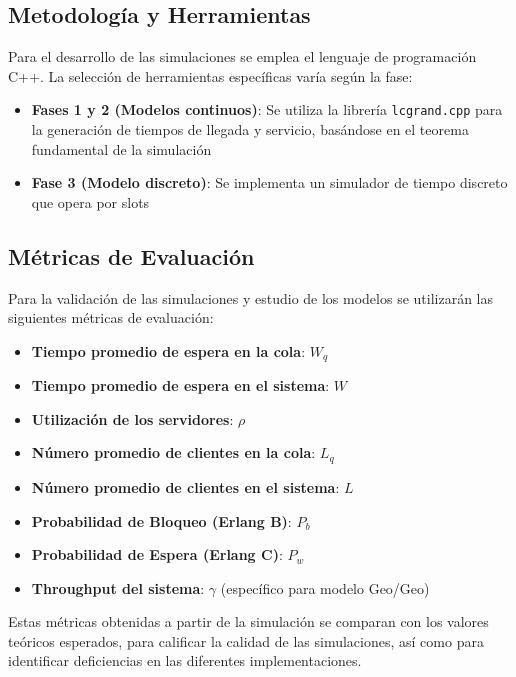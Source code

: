 \documentclass{article}
\begin{document}
\subsection{Metodología y Herramientas}

Para el desarrollo de las simulaciones se emplea el lenguaje de programación C++. La selección de herramientas específicas varía según la fase:

\begin{itemize}
    \item \textbf{Fases 1 y 2 (Modelos continuos)}: Se utiliza la librería \texttt{lcgrand.cpp} para la generación de tiempos de llegada y servicio, basándose en el teorema fundamental de la simulación
    \item \textbf{Fase 3 (Modelo discreto)}: Se implementa un simulador de tiempo discreto que opera por slots
\end{itemize}

\subsection{Métricas de Evaluación}

Para la validación de las simulaciones y estudio de los modelos se utilizarán las siguientes métricas de evaluación:

\begin{itemize}
    \item \textbf{Tiempo promedio de espera en la cola}: $W_q$
    \item \textbf{Tiempo promedio de espera en el sistema}: $W$
    \item \textbf{Utilización de los servidores}: $\rho$
    \item \textbf{Número promedio de clientes en la cola}: $L_q$
    \item \textbf{Número promedio de clientes en el sistema}: $L$
    \item \textbf{Probabilidad de Bloqueo (Erlang B)}: $P_b$
    \item \textbf{Probabilidad de Espera (Erlang C)}: $P_w$
    \item \textbf{Throughput del sistema}: $\gamma$ (específico para modelo Geo/Geo)
\end{itemize}

Estas métricas obtenidas a partir de la simulación se comparan con los valores teóricos esperados, para calificar la calidad de las simulaciones, así como para identificar deficiencias en las diferentes implementaciones.
\end{document}
